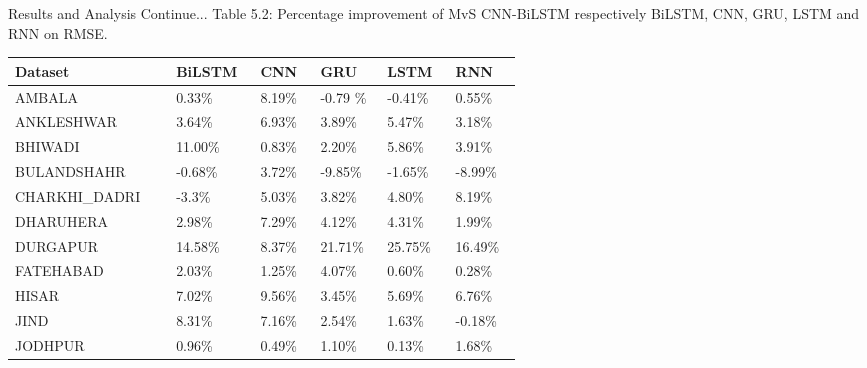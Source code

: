 \documentclass[12pt, aspectratio=169]{beamer}
\begin{document}
\begin{frame}{Results and Analysis \tiny{Continue...}}
	\centering
	\scriptsize{Table 5.2: Percentage improvement of MvS CNN-BiLSTM respectively BiLSTM,  CNN,  GRU,  LSTM and RNN on RMSE.}
	\begin{table}
        \begin{tabular}{ |p{0.19\linewidth} |p{0.08\linewidth} |p{0.08\linewidth} |p{0.08\linewidth} | p{0.08\linewidth} |p{0.08\linewidth}|}%
		\hline \scriptsize Dataset        & \scriptsize   BiLSTM & \scriptsize   CNN & \scriptsize  GRU & \scriptsize   LSTM & \scriptsize   RNN \\ \hline
       \scriptsize AMBALA & \scriptsize 0.33\% & \scriptsize 8.19\% & \scriptsize -0.79 \% & \scriptsize -0.41\% & \scriptsize 0.55\% \\ \hline
       \scriptsize ANKLESHWAR & \scriptsize 3.64\% & \scriptsize 6.93\% & \scriptsize 3.89\% & \scriptsize 5.47\% & \scriptsize 3.18\% \\ \hline
       \scriptsize BHIWADI & \scriptsize 11.00\% & \scriptsize 0.83\% & \scriptsize 2.20\% & \scriptsize 5.86\% & \scriptsize 3.91\% \\ \hline
       \scriptsize BULANDSHAHR & \scriptsize -0.68\% & \scriptsize 3.72\% & \scriptsize -9.85\% & \scriptsize -1.65\% & \scriptsize  -8.99\% \\ \hline
       \scriptsize CHARKHI\_DADRI & \scriptsize -3.3\% & \scriptsize  5.03\% & \scriptsize  3.82\% & \scriptsize  4.80\% & \scriptsize  8.19\% \\ \hline
       \scriptsize DHARUHERA & \scriptsize  2.98\% & \scriptsize  7.29\% & \scriptsize  4.12\% & \scriptsize  4.31\% & \scriptsize  1.99\% \\ \hline
       \scriptsize DURGAPUR & \scriptsize  14.58\% & \scriptsize  8.37\% & \scriptsize  21.71\% & \scriptsize  25.75\% & \scriptsize  16.49\% \\ \hline
       \scriptsize FATEHABAD & \scriptsize  2.03\% & \scriptsize  1.25\% & \scriptsize  4.07\% & \scriptsize  0.60\% & \scriptsize  0.28\% \\ \hline
       \scriptsize HISAR & \scriptsize  7.02\% & \scriptsize  9.56\% & \scriptsize  3.45\% & \scriptsize  5.69\% & \scriptsize  6.76\% \\ \hline
       \scriptsize JIND & \scriptsize  8.31\% & \scriptsize  7.16\% & \scriptsize  2.54\% & \scriptsize  1.63\% & \scriptsize  -0.18\% \\ \hline
       \scriptsize JODHPUR & \scriptsize  0.96\% & \scriptsize  0.49\% & \scriptsize  1.10\% & \scriptsize  0.13\% & \scriptsize  1.68\% \\ \hline

\end{tabular}
\end{table}
\end{frame}
\end{document}
